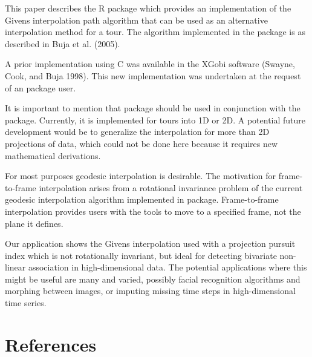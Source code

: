 This paper describes the R package  which provides an implementation of the Givens interpolation path algorithm that can be used as an alternative interpolation method for a tour. The algorithm implemented in the  package is as described in Buja et al. (2005).

A prior implementation using C was available in the XGobi software (Swayne, Cook, and Buja 1998). This new implementation was undertaken at the request of an  package user.

It is important to mention that  package should be used in conjunction with the  package. Currently, it is implemented for tours into 1D or 2D. A potential future development would be to generalize the interpolation for more than 2D projections of data, which could not be done here because it requires new mathematical derivations.

For most purposes geodesic interpolation is desirable. The motivation for frame-to-frame interpolation arises from a rotational invariance problem of the current geodesic interpolation algorithm implemented in  package. Frame-to-frame interpolation provides users with the tools to move to a specified frame, not the plane it defines.

Our application shows the Givens interpolation used with a projection pursuit index which is not rotationally invariant, but ideal for detecting bivariate non-linear association in high-dimensional data. The potential applications where this might be useful are many and varied, possibly facial recognition algorithms and morphing between images, or imputing missing time steps in high-dimensional time series.

\hypertarget{references}{%
\section*{References}\label{references}}

